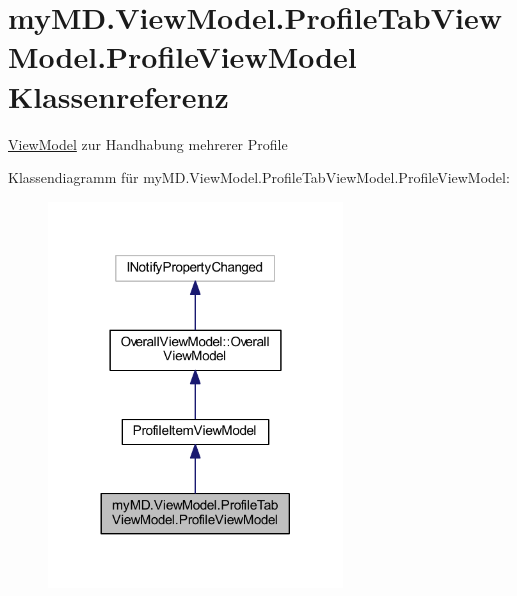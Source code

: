 \hypertarget{classmy_m_d_1_1_view_model_1_1_profile_tab_view_model_1_1_profile_view_model}{}\section{my\+M\+D.\+View\+Model.\+Profile\+Tab\+View\+Model.\+Profile\+View\+Model Klassenreferenz}
\label{classmy_m_d_1_1_view_model_1_1_profile_tab_view_model_1_1_profile_view_model}


\mbox{\hyperlink{namespacemy_m_d_1_1_view_model}{View\+Model}} zur Handhabung mehrerer Profile  




Klassendiagramm für my\+M\+D.\+View\+Model.\+Profile\+Tab\+View\+Model.\+Profile\+View\+Model\+:
\nopagebreak
\begin{figure}[H]
\begin{center}
\leavevmode
\includegraphics[width=221pt]{classmy_m_d_1_1_view_model_1_1_profile_tab_view_model_1_1_profile_view_model__inherit__graph}
\end{center}
\end{figure}


